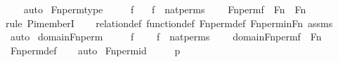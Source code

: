 \begin{isabellebody}
\ \ \isamarkupfalse%
\ auto%
\endisatagproof
{\isafoldproof}%
%
\isadelimproof
\isanewline
%
\endisadelimproof
\isanewline
{}\isamarkupfalse%
\ Fn{\isacharunderscore}{\kern0pt}perm{\isacharprime}{\kern0pt}{\isacharunderscore}{\kern0pt}type\ {\isacharcolon}{\kern0pt}\ \isanewline
\ \ \ f\isanewline
\ \ \ {\isachardoublequoteopen}f\ {\isasymin}\ nat{\isacharunderscore}{\kern0pt}perms{\isachardoublequoteclose}\ \isanewline
\ \ \ {\isachardoublequoteopen}Fn{\isacharunderscore}{\kern0pt}perm{\isacharprime}{\kern0pt}{\isacharparenleft}{\kern0pt}f{\isacharparenright}{\kern0pt}\ {\isasymin}\ Fn\ {\isasymrightarrow}\ Fn{\isachardoublequoteclose}\ \isanewline
%
\isadelimproof
\ \ %
\endisadelimproof
%
\isatagproof
{}\isamarkupfalse%
{\isacharparenleft}{\kern0pt}rule\ Pi{\isacharunderscore}{\kern0pt}memberI{\isacharparenright}{\kern0pt}\isanewline
\ \ \isamarkupfalse%
\ relation{\isacharunderscore}{\kern0pt}def\ function{\isacharunderscore}{\kern0pt}def\ Fn{\isacharunderscore}{\kern0pt}perm{\isacharprime}{\kern0pt}{\isacharunderscore}{\kern0pt}def\ Fn{\isacharunderscore}{\kern0pt}perm{\isacharunderscore}{\kern0pt}in{\isacharunderscore}{\kern0pt}Fn\ assms\isanewline
\ \ \isamarkupfalse%
\ auto%
\endisatagproof
{\isafoldproof}%
%
\isadelimproof
\isanewline
%
\endisadelimproof
\isanewline
{}\isamarkupfalse%
\ domain{\isacharunderscore}{\kern0pt}Fn{\isacharunderscore}{\kern0pt}perm{\isacharprime}{\kern0pt}\ {\isacharcolon}{\kern0pt}\ \isanewline
\ \ \ f\ \isanewline
\ \ \ {\isachardoublequoteopen}f\ {\isasymin}\ nat{\isacharunderscore}{\kern0pt}perms{\isachardoublequoteclose}\ \isanewline
\ \ \ {\isachardoublequoteopen}domain{\isacharparenleft}{\kern0pt}Fn{\isacharunderscore}{\kern0pt}perm{\isacharprime}{\kern0pt}{\isacharparenleft}{\kern0pt}f{\isacharparenright}{\kern0pt}{\isacharparenright}{\kern0pt}\ {\isacharequal}{\kern0pt}\ Fn{\isachardoublequoteclose}\ \isanewline
%
\isadelimproof
\ \ %
\endisadelimproof
%
\isatagproof
{}\isamarkupfalse%
\ Fn{\isacharunderscore}{\kern0pt}perm{\isacharprime}{\kern0pt}{\isacharunderscore}{\kern0pt}def\isanewline
\ \ \isamarkupfalse%
\ auto%
\endisatagproof
{\isafoldproof}%
%
\isadelimproof
\isanewline
%
\endisadelimproof
\isanewline
{}\isamarkupfalse%
\ Fn{\isacharunderscore}{\kern0pt}perm{\isacharunderscore}{\kern0pt}id\ {\isacharcolon}{\kern0pt}\ \isanewline
\ \ \ p\ \isanewline

\end{isabellebody}

